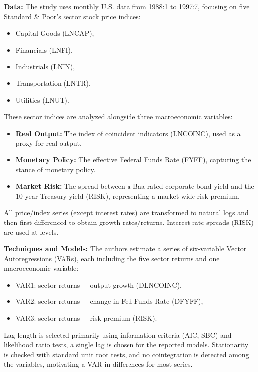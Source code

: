 \documentclass{article}
\begin{document}
\noindent \textbf{Data:}  
The study uses monthly U.S. data from 1988:1 to 1997:7, focusing on five Standard \& Poor's sector stock price indices:

\begin{itemize}
    \item Capital Goods (LNCAP),
    \item Financials (LNFI),
    \item Industrials (LNIN),
    \item Transportation (LNTR),
    \item Utilities (LNUT).
\end{itemize}

\noindent These sector indices are analyzed alongside three macroeconomic variables:

\begin{itemize}
    \item \textbf{Real Output:} The index of coincident indicators (LNCOINC), used as a proxy for real output.
    \item \textbf{Monetary Policy:} The effective Federal Funds Rate (FYFF), capturing the stance of monetary policy.
    \item \textbf{Market Risk:} The spread between a Baa-rated corporate bond yield and the 10-year Treasury yield (RISK), representing a market-wide risk premium.
\end{itemize}

\noindent All price/index series (except interest rates) are transformed to natural logs and then first-differenced to obtain growth rates/returns. Interest rate spreads (RISK) are used at levels.

\vspace{0.5em}

\noindent \textbf{Techniques and Models:}  
The authors estimate a series of six-variable Vector Autoregressions (VARs), each including the five sector returns and one macroeconomic variable:

\begin{itemize}
    \item VAR1: sector returns + output growth (DLNCOINC),
    \item VAR2: sector returns + change in Fed Funds Rate (DFYFF),
    \item VAR3: sector returns + risk premium (RISK).
\end{itemize}

\noindent Lag length is selected primarily using information criteria (AIC, SBC) and likelihood ratio tests, a single lag is chosen for the reported models. Stationarity is checked with standard unit root tests, and no cointegration is detected among the variables, motivating a VAR in differences for most series.
\end{document}

